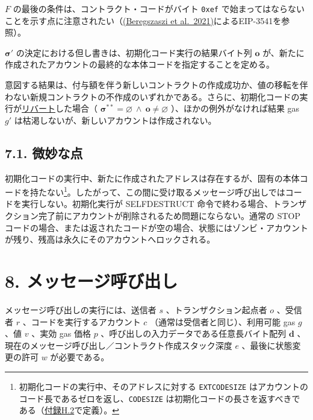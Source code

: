\documentclass[
]{ltjsarticle}
\begin{document}
\(F\) の最後の条件は、コントラクト・コードがバイト \texttt{0xef}
で始まってはならないことを示す点に注意されたい（\protect\hyperlink{ref-EIP-3541}{(Beregszaszi
et al.~2021)}によるEIP-3541を参照）。

\(\boldsymbol{\sigma}'\)
の決定における但し書きは、初期化コード実行の結果バイト列 \(\mathbf{o}\)
が、新たに作成されたアカウントの最終的な本体コードを指定することを定める。

意図する結果は、付与額を伴う新しいコントラクトの作成成功か、値の移転を伴わない新規コントラクトの不作成のいずれかである。さらに、初期化コードの実行が\protect\hyperlink{REVERT}{リバート}した場合（
\(\boldsymbol{\sigma}^{**} = \varnothing \ \wedge\ \mathbf{o} \neq \varnothing\)
）、ほかの例外がなければ結果 gas \(g'\)
は枯渇しないが、新しいアカウントは作成されない。

\hypertarget{ux5faeux5999ux306aux70b9}{%
\subsection{7.1. 微妙な点}\label{ux5faeux5999ux306aux70b9}}

初期化コードの実行中、新たに作成されたアドレスは存在するが、固有の本体コードを持たない\footnote{初期化コードの実行中、そのアドレスに対する
  \texttt{EXTCODESIZE}
  はアカウントのコード長であるゼロを返し、\texttt{CODESIZE}
  は初期化コードの長さを返すべきである（\protect\hyperlink{subsec:instruction-set}{付録H.2}で定義）。}。したがって、この間に受け取るメッセージ呼び出しではコードを実行しない。初期化実行が
SELFDESTRUCT
命令で終わる場合、トランザクション完了前にアカウントが削除されるため問題にならない。通常の
STOP
コードの場合、または返されたコードが空の場合、状態にはゾンビ・アカウントが残り、残高は永久にそのアカウントへロックされる。

\protect\hypertarget{ch:call}{}{}

\hypertarget{ux30e1ux30c3ux30bbux30fcux30b8ux547cux3073ux51faux3057}{%
\section{8.
メッセージ呼び出し}\label{ux30e1ux30c3ux30bbux30fcux30b8ux547cux3073ux51faux3057}}

メッセージ呼び出しの実行には、送信者 \(s\) 、トランザクション起点者
\(o\) 、受信者 \(r\) 、コードを実行するアカウント \(c\)
（通常は受信者と同じ）、利用可能 gas \(g\) 、値 \(v\) 、実効 gas 価格
\(p\) 、呼び出しの入力データである任意長バイト配列 \(\mathbf{d}\)
、現在のメッセージ呼び出し／コントラクト作成スタック深度 \(e\)
、最後に状態変更の許可 \(w\) が必要である。
\end{document}
